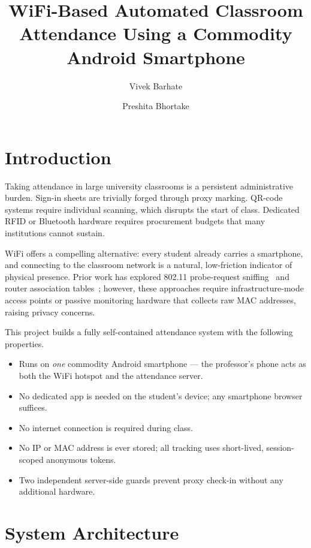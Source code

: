 \documentclass[sigconf,nonacm]{acmart}
\title{WiFi-Based Automated Classroom Attendance
       Using a Commodity Android Smartphone}
\author{Vivek Barhate}
\affiliation{%
  \institution{George Mason University}
  \department{Department of Computer Science}
  \country{USA}}
\author{Preshita Bhortake}
\affiliation{%
  \institution{George Mason University}
  \department{Department of Computer Science}
  \country{USA}}
\begin{document}
\maketitle

\section{Introduction}

Taking attendance in large university classrooms is a persistent
administrative burden.  Sign-in sheets are trivially forged through
proxy marking.  QR-code systems require individual scanning, which
disrupts the start of class.  Dedicated RFID or Bluetooth hardware
requires procurement budgets that many institutions cannot sustain.

WiFi offers a compelling alternative: every student already carries a
smartphone, and connecting to the classroom network is a natural,
low-friction indicator of physical presence.  Prior work has explored
802.11 probe-request sniffing~\cite{demir2014} and router association
tables~\cite{hwang2017}; however, these approaches require
infrastructure-mode access points or passive monitoring hardware that
collects raw MAC addresses, raising privacy concerns.

This project builds a fully self-contained attendance system with the
following properties.

\begin{itemize}
  \item Runs on \emph{one} commodity Android smartphone --- the
        professor's phone acts as both the WiFi hotspot and the
        attendance server.
  \item No dedicated app is needed on the student's device; any
        smartphone browser suffices.
  \item No internet connection is required during class.
  \item No IP or MAC address is ever stored; all tracking uses
        short-lived, session-scoped anonymous tokens.
  \item Two independent server-side guards prevent proxy check-in
        without any additional hardware.
\end{itemize}

\section{System Architecture}
\end{document}
